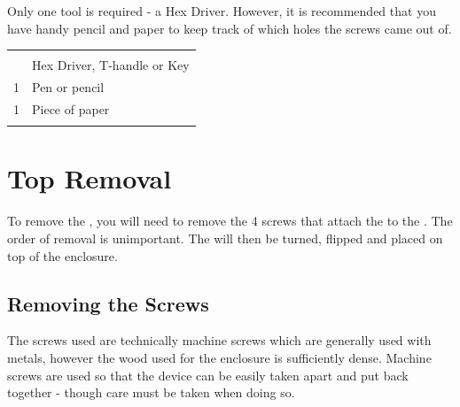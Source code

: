 Only one tool is required - a  Hex Driver.  However, it is
recommended that you have handy pencil and paper to keep track of which holes
the screws came out of.

\begin{table}[H]
\centering
\begin{tabu} { X[1,r,m] | X[6,l,m] }
  \thrule
   &  \\  &  Hex Driver, T-handle or Key \\ 
  1 & Pen or pencil \\ 
  1 & Piece of paper \\
  \bhrule
\end{tabu}
\end{table}

\section{Top Removal} \label{Top Removal}

To remove the , you will need to remove the \num{4} screws that attach
the  to the .  The order of removal is unimportant.  The 
will then be turned, flipped and placed on top of the enclosure.


\subsection{Removing the Screws} \label{Removing the Screws}

The screws used are technically machine screws which are generally used with
metals, however the wood used for the enclosure is sufficiently dense. Machine
screws are used so that the device can be easily taken apart and put back
together - though care must be taken when doing so.

